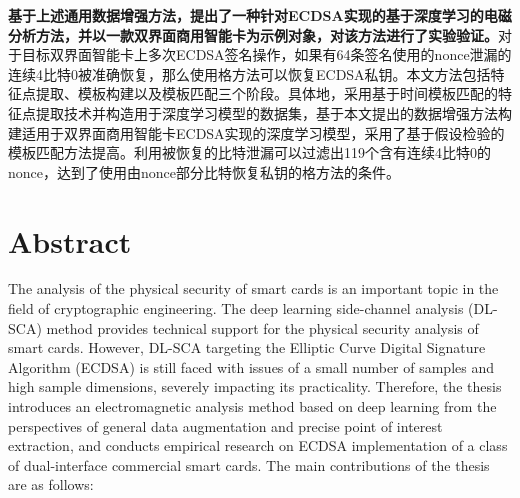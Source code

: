 \textbf{基于上述通用数据增强方法，提出了一种针对ECDSA实现的基于深度学习的电磁分析方法，并以一款双界面商用智能卡为示例对象，对该方法进行了实验验证。}对于目标双界面智能卡上多次ECDSA签名操作，如果有64条签名使用的nonce泄漏的连续4比特0被准确恢复，那么使用格方法可以恢复ECDSA私钥。本文方法包括特征点提取、模板构建以及模板匹配三个阶段。具体地，采用基于时间模板匹配的特征点提取技术并构造用于深度学习模型的数据集，基于本文提出的数据增强方法构建适用于双界面商用智能卡ECDSA实现的深度学习模型，采用了基于假设检验的模板匹配方法提高\zyx。利用被恢复的比特泄漏可以过滤出119个含有连续4比特0的nonce，达到了使用由nonce部分比特恢复私钥的格方法的条件。

\intobmk\chapter*{Abstract}%


The analysis of the physical security of smart cards is an important topic in the field of cryptographic engineering. The deep learning side-channel analysis (DL-SCA) method provides technical support for the physical security analysis of smart cards. %
However, DL-SCA targeting the Elliptic Curve Digital Signature Algorithm (ECDSA) is still faced with issues of a small number of samples and high sample dimensions, severely impacting its practicality. 
Therefore, the thesis introduces an electromagnetic analysis method based on deep learning from the perspectives of general data augmentation and precise point of interest extraction, and conducts empirical research on ECDSA implementation of a class of dual-interface commercial smart cards. The main contributions of the thesis are as follows:

